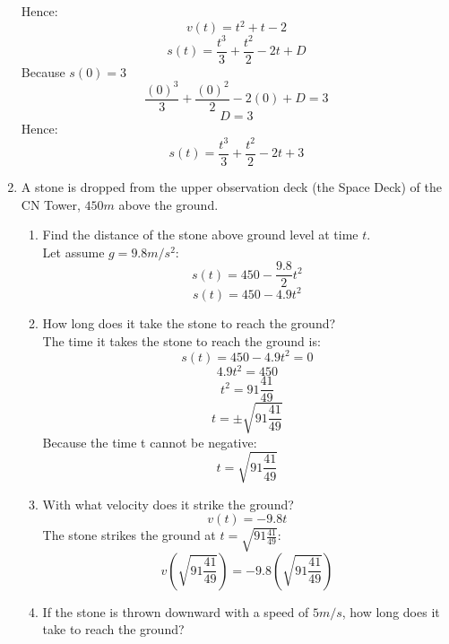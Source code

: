 \documentclass[12pt]{article}
\begin{document}
\begin{enumerate}
    Hence:
    \[v(t) = t^2 + t -2\]
    \[s(t) = \frac{t^3}{3} + \frac{t^2}{2} - 2t + D\]
    Because $s(0) = 3$
    \[\frac{(0)^3}{3} + \frac{(0)^2}{2} -2(0) + D = 3\]
    \[D = 3\]
    Hence:
    \[s(t) = \frac{t^3}{3} + \frac{t^2}{2} -2t + 3\]
    \setcounter{enumi}{64}
    \item A stone is dropped from the upper observation deck (the Space Deck) of the CN Tower, $450m$ above the ground.
    \begin{enumerate}
        \item Find the distance of the stone above ground level at time $t$.\\
        Let assume $g = 9.8m/s^2$:
        \[s(t) = 450 - \frac{9.8}{2}t^2\]
        \[s(t) = 450 - 4.9t^2\]
        \item How long does it take the stone to reach the ground?\\
        The time it takes the stone to reach the ground is:
        \[s(t) = 450 - 4.9t^2 = 0\]
        \[4.9t^2 = 450\]
        \[t^2 = 91\frac{41}{49}\]
        \[t = \pm\sqrt{91\frac{41}{49}}\]
        Because the time t cannot be negative:
        \[t = \sqrt{91\frac{41}{49}}\]
        \item With what velocity does it strike the ground?
        \[v(t) = -9.8t\]
        The stone strikes the ground at $t = \sqrt{91\frac{41}{49}}$:
        \[v(\sqrt{91\frac{41}{49}}) = -9.8(\sqrt{91\frac{41}{49}})\]
        \item If the stone is thrown downward with a speed of $5m/s$, how long does it take to reach the ground?
    \end{enumerate}
\end{enumerate}
\end{document}
